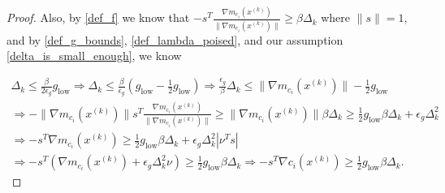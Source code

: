 \documentclass{article}
\theoremstyle{case}
\newcommand{\xk}{{x^{(k)}}}
\newcommand{\dk}{\Delta_k}
\newcommand{\wik}{{w^{(i, k)}}}
\newcommand{\gmcik}{{\nabla m_{c_i}(\xk)}}
\newcommand{\hgik}{{\frac{\nabla m_{c_i}(\xk)}{\|\nabla m_{c_i}(\xk)\|}}}
\begin{document}
\begin{proof}





Also, by \cref{def_f} we know that $-s^T \hgik \ge \beta \dk$ where $\|s\| = 1$, and by \cref{def_g_bounds}, \cref{def_lambda_poised}, and our assumption \cref{delta_is_small_enough}, we know

\begin{align}
\dk \le \frac{\beta}{2\epsilon_{g}}g_{\text{low}}
\Longrightarrow \dk \le \frac{\beta}{\epsilon_{g}}\left(g_{\text{low}} - \frac 1 2 g_{\text{low}}\right)
\Longrightarrow \frac{\epsilon_{g}}{\beta} \dk \le \|\gmcik\| - \frac 1 2 g_{\text{low}} \nonumber \\
\Longrightarrow -\|\gmcik\|s^T\hgik \ge \|\gmcik\|\beta\dk \ge \frac 1 2 g_{\text{low}} \beta \dk + \epsilon_{g}\dk^2  \nonumber \\
\Longrightarrow -s^T\gmcik \ge \frac 1 2 g_{\text{low}} \beta \dk + \epsilon_{g}\dk^2|\nu^T s| \nonumber \\ 
\Longrightarrow -s^T\left(\gmcik + \epsilon_{g}\dk^2\nu\right) \ge \frac 1 2 g_{\text{low}} \beta \dk 
\Longrightarrow -s^T\nabla c_i(\xk) \ge \frac 1 2 g_{\text{low}} \beta \dk. \label{nsc_pos}
\end{align}


\end{proof}
\end{document}
